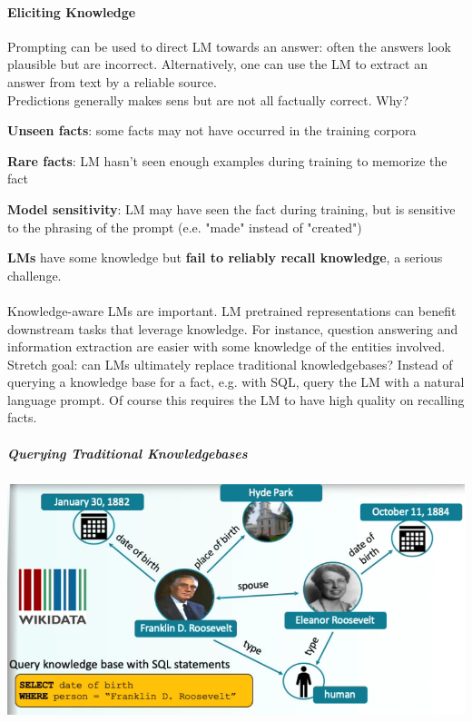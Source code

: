 \documentclass[10pt]{report}
\begin{document}
\paragraph{Eliciting Knowledge} Prompting can be used to direct LM towards an answer: often the answers look plausible but are incorrect. Alternatively, one can use the LM to extract an answer from text by a reliable source.\\
Predictions generally makes sens but are not all factually correct. Why?\begin{list}{}{}
	\item \textbf{Unseen facts}: some facts may not have occurred in the training corpora
	\item \textbf{Rare facts}: LM hasn't seen enough examples during training to memorize the fact
	\item \textbf{Model sensitivity}: LM may have seen the fact during training, but is sensitive to the phrasing of the prompt (e.e. "made" instead of "created")
\end{list}
\textbf{LMs} have some knowledge but \textbf{fail to reliably recall knowledge}, a serious challenge.\\\\
Knowledge-aware LMs are important. LM pretrained representations can benefit downstream tasks that leverage knowledge. For instance, question answering and information extraction are easier with some knowledge of the entities involved. Stretch goal: can LMs ultimately replace traditional knowledgebases? Instead of querying a knowledge base for a fact, e.g. with SQL, query the LM with a natural language prompt. Of course this requires the LM to have high quality on recalling facts.
\subparagraph{Querying Traditional Knowledgebases}
\begin{center}
	\includegraphics[scale=0.5]{104.png}
\end{center}
\end{document}
